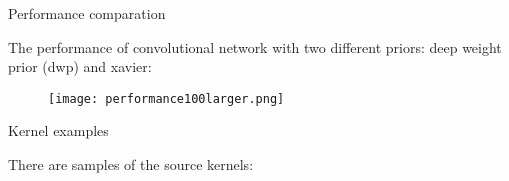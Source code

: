\documentclass[19pt]{beamer}
\begin{document}
\begin{frame}{Performance comparation}

The performance of convolutional network with two different priors: deep weight prior (dwp) and xavier:\\

\begin{figure}
    \centering
    \texttt{[image: performance100larger.png]}
    \label{fig:my_label}
\end{figure}

\end{frame}

\begin{frame}{Kernel examples}

There are samples of the source kernels:\\

\begin{figure}
    \centering
    \begin{subfigure}%
        \texttt{[image: sourcekernel1.jpg]}
    \end{subfigure}
    ~ %
    \begin{subfigure}%
        \texttt{[image: sourcekernel2.jpg]}
        \label{fig:tiger}
    \end{subfigure}
    ~ %
    \begin{subfigure}%
        \texttt{[image: sourcekernel3.jpg]}
        \label{fig:mouse}
    \end{subfigure}
     ~ %
    \begin{subfigure}%
        \texttt{[image: sourcekernel4.jpg]}
        \label{fig:mouse}
    \end{subfigure}
    \label{fig:animals}
\end{figure}


\end{frame}
\end{document}

